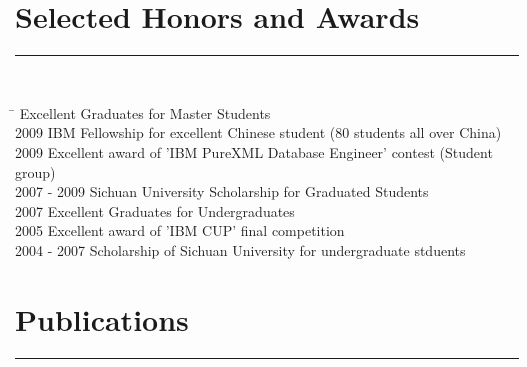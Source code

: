 \documentclass{res}
\begin{document}
\begin{resume}
\section{\bfseries\Large Selected Honors and Awards}
\hspace{-0.5in}\rule{16.8cm}{0.4pt}\\[-0.9cm]
    \vspace{-5pt}
    \begin{tabbing}
    \hspace{1.1in}\=                 \>  Excellent Graduates for Master Students\\
        2009                \>  IBM Fellowship for excellent Chinese student (80 students all over China)\\
        2009                \>  Excellent award of 'IBM PureXML Database Engineer' contest (Student group)\\
        2007 - 2009          \>  Sichuan University Scholarship for Graduated Students \\
        2007                \>  Excellent Graduates for Undergraduates\\
        2005                \>  Excellent award of 'IBM CUP' final competition\\
        2004 - 2007           \>  Scholarship of Sichuan University for undergraduate stduents\\
    \end{tabbing}


\section{\bfseries\Large Publications}
\hspace{-0.5in}\rule{16.8cm}{0.4pt}\\[-0.5cm]
%


\end{resume}
\end{document}
